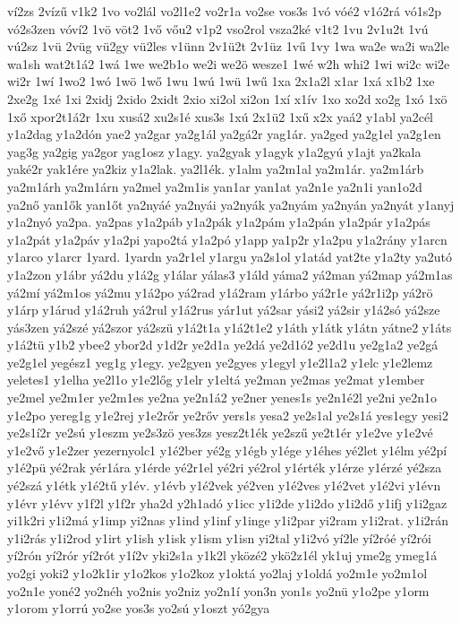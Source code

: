 {ví2zs
2vízű
v1k2
1vo
vo2lál
vo2l1e2
vo2r1a
vo2se
vos3s
1vó
vóé2
v1ó2rá
vó1s2p
vó2s3zen
vóví2
1vö
vöt2
1vő
vőu2
v1p2
vso2rol
vsza2ké
v1t2
1vu
2v1u2t
1vú
vú2sz
1vü
2vüg
vü2gy
vü2les
v1ünn
2v1ü2t
2v1üz
1vű
1vy
1wa
wa2e
wa2i
wa2le
wa1sh
wat2t1á2
1wá
1we
we2b1o
we2i
we2ö
wesze1
1wé
w2h
whi2
1wi
wi2c
wi2e
wi2r
1wí
1wo2
1wó
1wö
1wő
1wu
1wú
1wü
1wű
1xa
2x1a2l
x1ar
1xá
x1b2
1xe
2xe2g
1xé
1xi
2xidj
2xido
2xidt
2xio
xi2ol
xi2on
1xí
x1ív
1xo
xo2d
xo2g
1xó
1xö
1xő
xpor2t1á2r
1xu
xusá2
xu2s1é
xus3s
1xú
2x1ü2
1xű
x2x
yaá2
y1abl
ya2cél
y1a2dag
y1a2dón
yae2
ya2gar
ya2g1ál
ya2gá2r
yag1ár.
ya2ged
ya2g1el
ya2g1en
yag3g
ya2gig
ya2gor
yag1osz
y1agy.
ya2gyak
y1agyk
y1a2gyú
y1ajt
ya2kala
yaké2r
yak1ére
ya2kiz
y1a2lak.
ya2l1ék.
y1alm
ya2m1al
ya2m1ár.
ya2m1árb
ya2m1árh
ya2m1árn
ya2mel
ya2m1is
yan1ar
yan1at
ya2n1e
ya2n1i
yan1o2d
ya2nő
yan1ők
yan1őt
ya2nyáé
ya2nyái
ya2nyák
ya2nyám
ya2nyán
ya2nyát
y1anyj
y1a2nyó
ya2pa.
ya2pas
y1a2páb
y1a2pák
y1a2pám
y1a2pán
y1a2pár
y1a2pás
y1a2pát
y1a2páv
y1a2pi
yapo2tá
y1a2pó
y1app
ya1p2r
y1a2pu
y1a2rány
y1arcn
y1arco
y1arcr
1yard.
1yardn
ya2r1el
y1argu
ya2s1ol
y1atád
yat2te
y1a2ty
ya2utó
y1a2zon
y1ábr
yá2du
y1á2g
y1álar
yálas3
y1áld
yáma2
yá2man
yá2map
yá2m1as
yá2mí
yá2m1os
yá2mu
y1á2po
yá2rad
y1á2ram
y1árbo
yá2r1e
yá2r1i2p
yá2rö
y1árp
y1árud
y1á2ruh
yá2rul
y1á2rus
yár1ut
yá2sar
yási2
yá2sir
y1á2só
yá2sze
yás3zen
yá2szé
yá2szor
yá2szü
y1á2t1a
y1á2t1e2
y1áth
y1átk
y1átn
yátne2
y1áts
y1á2tü
y1b2
ybee2
ybor2d
y1d2r
ye2d1a
ye2dá
ye2d1ó2
ye2d1u
ye2g1a2
ye2gá
ye2g1el
yegész1
yeg1g
y1egy.
ye2gyen
ye2gyes
y1egyl
y1e2l1a2
y1elc
y1e2lemz
yeletes1
y1elha
ye2l1o
y1e2lőg
y1elr
y1eltá
ye2man
ye2mas
ye2mat
y1ember
ye2mel
ye2m1er
ye2m1es
ye2na
ye2n1á2
ye2ner
yenes1s
ye2n1é2l
ye2ni
ye2n1o
y1e2po
yereg1g
y1e2rej
y1e2rőr
ye2rőv
yers1s
yesa2
ye2s1al
ye2s1á
yes1egy
yesi2
ye2s1í2r
ye2sú
y1eszm
ye2s3zö
yes3zs
yesz2t1ék
ye2szű
ye2t1ér
y1e2ve
y1e2vé
y1e2vő
y1e2zer
yezernyolc1
y1é2ber
yé2g
y1égb
y1ége
y1éhes
yé2let
y1élm
yé2pí
y1é2pü
yé2rak
yér1ára
y1érde
yé2r1el
yé2ri
yé2rol
y1érték
y1érze
y1érzé
yé2sza
yé2szá
y1étk
y1é2tű
y1év.
y1évb
y1é2vek
yé2ven
y1é2ves
y1é2vet
y1é2vi
y1évn
y1évr
y1évv
y1f2l
y1f2r
yha2d
y2h1adó
y1icc
y1i2de
y1i2do
y1i2dő
y1ifj
y1i2gaz
yi1k2ri
y1i2má
y1imp
yi2nas
y1ind
y1inf
y1inge
y1i2par
yi2ram
y1i2rat.
y1i2rán
y1i2rás
y1i2rod
y1irt
y1ish
y1isk
y1ism
y1isn
yi2tal
y1i2vó
yí2le
yí2róé
yí2rói
yí2rón
yí2rór
yí2rót
y1í2v
yki2s1a
y1k2l
yközé2
ykö2z1él
yk1uj
yme2g
ymeg1á
yo2gi
yoki2
y1o2k1ir
y1o2kos
y1o2koz
y1oktá
yo2laj
y1oldá
yo2m1e
yo2m1ol
yo2n1e
yoné2
yo2néh
yo2nis
yo2niz
yo2n1í
yon3n
yon1s
yo2nü
y1o2pe
y1orm
y1orom
y1orrú
yo2se
yos3s
yo2sú
y1oszt
yó2gya
}
